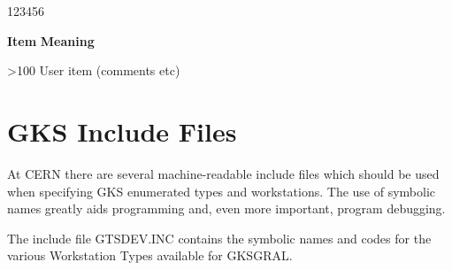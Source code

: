 \begin{DLtt}{123456}
\item[{\rm\bf Item}] {\bf Meaning}
\item[>100]User item (comments etc)
\end{DLtt}

\chapter{\protect\label{sec:hdenum}GKS Include Files}
 
At CERN there are several machine-readable include files which
should be used when specifying GKS enumerated types and workstations.
The use of symbolic names greatly aids programming and, even
more important, program debugging.
 
The include file GTSDEV.INC contains the symbolic names and codes
for the various Workstation Types available for GKSGRAL.
 
